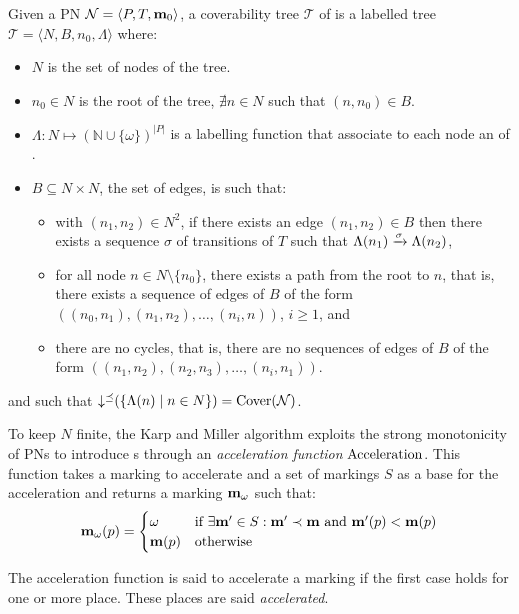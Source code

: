 \begin{defi}
  Given a \ac{PN} $\mathcal{N} = \langle P,T, \mathbf{m}_0\rangle$, a coverability tree $\mathcal{T}$ of \N is a labelled tree $\mathcal{T} = \langle N, B, n_0, \Lambda\rangle$ where:
  \begin{itemize}
    \item $N$ is the set of nodes of the tree.%
    \item $n_0 \in N$ is the root of the tree,  $\nexists n \in N$ such that $(n, n_0) \in B$.
    \item $\Lambda : N \mapsto (\mathbb{N} \cup \{\omega\})^{|P|}$ is a labelling function that associate to each node an \omark of \N.
    \item $B \subseteq N \times N$, the set of edges, is such that:
      \begin{itemize}
        \item with $(n_1, n_2) \in N^2$, if there exists an edge $(n_1, n_2) \in B$ then there exists a sequence $\sigma$ of transitions of $T$ such that $\Lambda(n_1) \xrightarrow{\sigma} \Lambda(n_2)$,
        \item for all node $n \in N \setminus \{n_0\}$, there exists a path from the root to $n$, that is, there exists a sequence of edges of $B$ of the form $((n_0, n_1), (n_1, n_2), \dots, (n_{i}, n))$, $i \geq 1$, and
        \item there are no cycles, that is, there are no sequences of edges of $B$ of the form $((n_1, n_2), (n_2, n_3), \dots, (n_i, n_1))$.
      \end{itemize}
  \end{itemize}
  and such that $\operatorname{\downarrow^\preceq}(\{\Lambda(n) \mid n \in N\}) = \operatorname{Cover}(\mathcal{N})$.
\end{defi}

To keep $N$ finite, the Karp and Miller algorithm exploits the strong monotonicity of \acp{PN} to introduce \omark{}s through an \emph{acceleration function} $\operatorname{Acceleration}$.
This function takes a marking \mar to accelerate and a set of markings $S$ as a base for the acceleration and returns a marking $\mathbf{m}_\omega$ such that:
\[
  \mathbf{m}_\omega(p) =
  \begin{cases}
    \omega    &\text{if } \exists \mathbf{m'} \in S : \mathbf{m'} \prec \mathbf{m} \text{ and } \mathbf{m'}(p) < \mathbf{m}(p) \\
    \mathbf{m}(p)  &\text{otherwise}
  \end{cases}
\]

The acceleration function is said to accelerate a marking if the first case holds for one or more place.
These places are said \emph{accelerated}.

